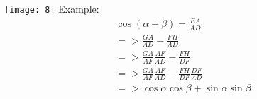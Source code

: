 	\texttt{[image: 8]}
	\newline
	Example:
	\begin{align}
		\cos(\alpha+\beta) = \frac{EA}{AD} \\
		=> \frac{GA}{AD}-\frac{FH}{AD} \\
		=> \frac{GA}{AF}\frac{AF}{AD}-\frac{FH}{DF} \\
		=> \frac{GA}{AF}\frac{AF}{AD}-\frac{FH}{DF}\frac{DF}{AD} \\
		=> \cos\alpha \cos\beta + \sin\alpha \sin\beta \\
	\end{align}
	






